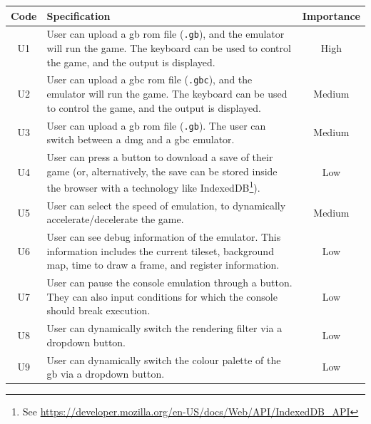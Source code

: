 \documentclass[11pt]{informatics-report}
\newcommand{\ftnt}[1]{\footnote{See \url{#1}}}
\begin{document}
\begin{xltabular}{\textwidth}{|c|X|c|}
    \hline
    \textbf{Code} & \textbf{Specification} & \textbf{Importance}\\
    \hline\hline
    \endhead

    U1 & User can upload a \gls{gb} \gls{rom} file (\texttt{.gb}), and the emulator will run the game. The keyboard can be used to control the game, and the output is displayed. & High \\ \hline
    U2 & User can upload a \gls{gbc} \gls{rom} file (\texttt{.gbc}), and the emulator will run the game. The keyboard can be used to control the game, and the output is displayed. & Medium \\ \hline
    U3 & User can upload a \gls{gb} \gls{rom} file (\texttt{.gb}). The user can switch between a \gls{dmg} and a \gls{gbc} emulator. & Medium \\ \hline
    U4 & User can press a button to download a save of their game (or, alternatively, the save can be stored inside the browser with a technology like IndexedDB\ftnt{https://developer.mozilla.org/en-US/docs/Web/API/IndexedDB_API}). & Low \\ \hline
    U5 & User can select the speed of emulation, to dynamically accelerate/decelerate the game. & Medium \\ \hline
    U6 & User can see debug information of the emulator. This information includes the current tileset, background map, time to draw a frame, and register information. & Low \\ \hline
    U7 & User can pause the console emulation through a button. They can also input conditions for which the console should break execution. & Low \\ \hline
    U8 & User can dynamically switch the rendering filter via a dropdown button. & Low \\ \hline
    U9 & User can dynamically switch the colour palette of the \gls{gb} via a dropdown button. & Low \\ \hline


\end{xltabular}
\end{document}
